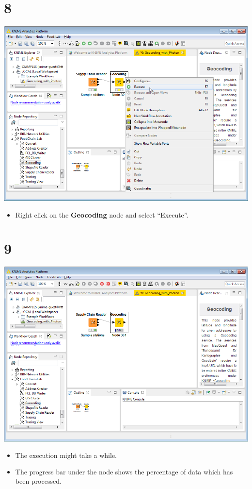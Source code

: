 \documentclass[10pt]{beamer}
\begin{document}
\section{8}
\begin{frame}
	\begin{center}
  		\includegraphics[height=0.6\textheight]{8.png}
	\end{center}
	\begin{itemize}
		\item Right click on the \textbf{Geocoding} node and select ``Execute''.
	\end{itemize}
\end{frame}

\section{9}
\begin{frame}
	\begin{center}
  		\includegraphics[height=0.6\textheight]{9.png}
	\end{center}
	\begin{itemize}
		\item The execution might take a while.
		\item The progress bar under the node shows the percentage of data which has been processed.
	\end{itemize}
\end{frame}
\end{document}
